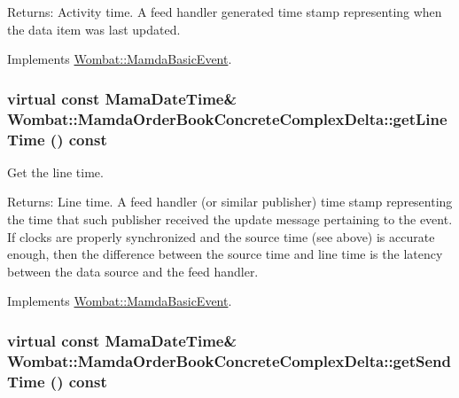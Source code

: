 \begin{Desc}
\item[Returns:]Activity time. A feed handler generated time stamp representing when the data item was last updated. \end{Desc}


Implements \hyperlink{classWombat_1_1MamdaBasicEvent_b3810afc69474ef3b192ee4c9307e714}{Wombat::Mamda\-Basic\-Event}.\hypertarget{classWombat_1_1MamdaOrderBookConcreteComplexDelta_e3492571a52dbdbfd47f21da84a38c33}{
\subsubsection[getLineTime]{\setlength{\rightskip}{0pt plus 5cm}virtual const Mama\-Date\-Time\& Wombat::Mamda\-Order\-Book\-Concrete\-Complex\-Delta::get\-Line\-Time () const}}
\label{classWombat_1_1MamdaOrderBookConcreteComplexDelta_e3492571a52dbdbfd47f21da84a38c33}


Get the line time. 

\begin{Desc}
\item[Returns:]Line time. A feed handler (or similar publisher) time stamp representing the time that such publisher received the update message pertaining to the event. If clocks are properly synchronized and the source time (see above) is accurate enough, then the difference between the source time and line time is the latency between the data source and the feed handler. \end{Desc}


Implements \hyperlink{classWombat_1_1MamdaBasicEvent_3fcc26fa1a6446bcec12b11ac74ed26d}{Wombat::Mamda\-Basic\-Event}.\hypertarget{classWombat_1_1MamdaOrderBookConcreteComplexDelta_5465c0fc1945d5e28f17972ed12f2bbb}{
\subsubsection[getSendTime]{\setlength{\rightskip}{0pt plus 5cm}virtual const Mama\-Date\-Time\& Wombat::Mamda\-Order\-Book\-Concrete\-Complex\-Delta::get\-Send\-Time () const}}
\label{classWombat_1_1MamdaOrderBookConcreteComplexDelta_5465c0fc1945d5e28f17972ed12f2bbb}


